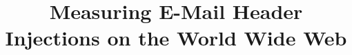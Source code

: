 \documentclass{sig-alternate-05-2015}
\begin{document}
	
	
	
	
	
	
	
	
    \title{Measuring E-Mail Header Injections on the World
    	Wide Web}
	

    
\end{document}
